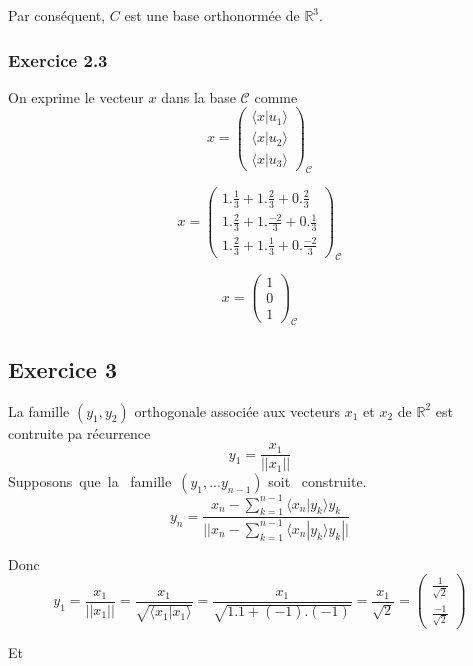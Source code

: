 \documentclass[]{book}
\theoremstyle{definition}
\newcommand{\bb}[1]{\mathbb{#1}}
\newcommand{\R}{\bb{R}}
\begin{document}
Par cons\'equent, $C$ est une base orthonorm\'ee de $\R^3$. 

\subsubsection*{Exercice 2.3}
On exprime le vecteur $x$ dans la base $\mathcal{C}$ comme 
$$x = \begin{pmatrix} \langle x|u_1 \rangle \\ \langle x|u_2 \rangle  \\ \langle x|u_3 \rangle  \end{pmatrix}_{\mathcal{C}}$$

$$x = \begin{pmatrix} 1.\frac{1}{3}+ 1.\frac{2}{3} + 0.\frac{2}{3} \\ 1.\frac{2}{3}+ 1.\frac{-2}{3} + 0.\frac{1}{3} \\ 1.\frac{2}{3}+ 1.\frac{1}{3} + 0.\frac{-2}{3} \end{pmatrix}_{\mathcal{C}}$$

$$x = \begin{pmatrix} 1 \\ 0 \\ 1 \end{pmatrix}_{\mathcal{C}}$$



\subsection*{Exercice 3}
La famille $(y_1,y_2)$ orthogonale associ\'ee aux vecteurs $x_1$ et $x_2$ de $\R^2$ est contruite pa r\'ecurrence
$$y_1 = \frac{x_1}{||x_1||}$$
Supposons\ que\ la \ famille\ $(y_1, ... y_{n-1})$ soit \ construite. 
$$y_n = \frac{x_n-\sum_{k=1}^{n-1}\langle x_n|y_k \rangle y_k}{||x_n-\sum_{k=1}^{n-1}\langle x_n|y_k \rangle y_k||}$$

Donc
$$y_1 = \frac{x_1}{||x_1||} = \frac{x_1}{\sqrt{\langle x_1 | x_1 \rangle}} = \frac{x_1}{\sqrt{1.1+(-1).(-1)}} = \frac{x_1}{\sqrt{2}} = \begin{pmatrix} \frac{1}{\sqrt{2}}\\ \frac{-1}{\sqrt{2}} \end{pmatrix}$$

Et
\end{document}
